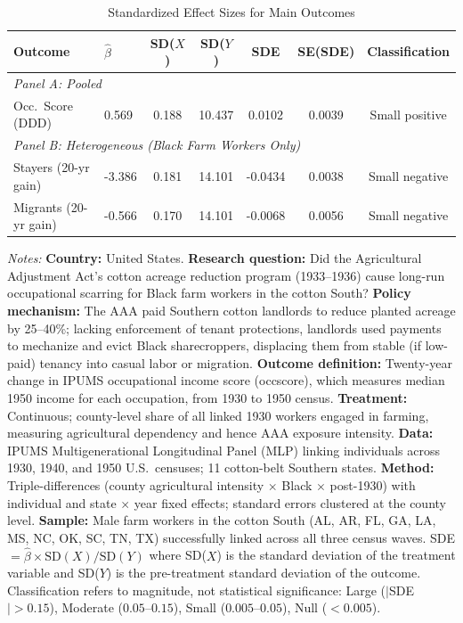 \begin{table}[H]
\centering
\caption{Standardized Effect Sizes for Main Outcomes}
\label{tab:sde}
\begin{threeparttable}
\begin{tabular}{llccccc}
\toprule
Outcome & $\hat{\beta}$ & SD($X$) & SD($Y$) & SDE & SE(SDE) & Classification \\
\midrule
\multicolumn{7}{l}{\textit{Panel A: Pooled}} \\
Occ.\ Score (DDD) & 0.569 & 0.188 & 10.437 & 0.0102 & 0.0039 & Small positive \\
\midrule
\multicolumn{7}{l}{\textit{Panel B: Heterogeneous (Black Farm Workers Only)}} \\
Stayers (20-yr gain) & -3.386 & 0.181 & 14.101 & -0.0434 & 0.0038 & Small negative \\
Migrants (20-yr gain) & -0.566 & 0.170 & 14.101 & -0.0068 & 0.0056 & Small negative \\
\bottomrule
\end{tabular}
\begin{tablenotes}[flushleft]
\small
\item \textit{Notes:} \textbf{Country:} United States. \textbf{Research question:} Did the Agricultural Adjustment Act's cotton acreage reduction program (1933--1936) cause long-run occupational scarring for Black farm workers in the cotton South? \textbf{Policy mechanism:} The AAA paid Southern cotton landlords to reduce planted acreage by 25--40\%; lacking enforcement of tenant protections, landlords used payments to mechanize and evict Black sharecroppers, displacing them from stable (if low-paid) tenancy into casual labor or migration. \textbf{Outcome definition:} Twenty-year change in IPUMS occupational income score (occscore), which measures median 1950 income for each occupation, from 1930 to 1950 census. \textbf{Treatment:} Continuous; county-level share of all linked 1930 workers engaged in farming, measuring agricultural dependency and hence AAA exposure intensity. \textbf{Data:} IPUMS Multigenerational Longitudinal Panel (MLP) linking individuals across 1930, 1940, and 1950 U.S.\ censuses; 11 cotton-belt Southern states. \textbf{Method:} Triple-differences (county agricultural intensity $\times$ Black $\times$ post-1930) with individual and state $\times$ year fixed effects; standard errors clustered at the county level. \textbf{Sample:} Male farm workers in the cotton South (AL, AR, FL, GA, LA, MS, NC, OK, SC, TN, TX) successfully linked across all three census waves. SDE $= \hat{\beta} \times \text{SD}(X) / \text{SD}(Y)$ where SD($X$) is the standard deviation of the treatment variable and SD($Y$) is the pre-treatment standard deviation of the outcome. Classification refers to magnitude, not statistical significance: Large ($|$SDE$| > 0.15$), Moderate ($0.05$--$0.15$), Small ($0.005$--$0.05$), Null ($< 0.005$).
\end{tablenotes}
\end{threeparttable}
\end{table}

